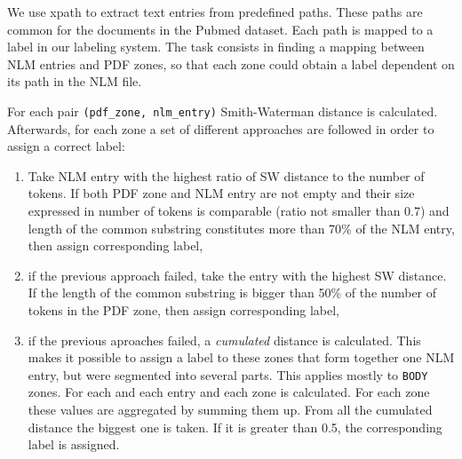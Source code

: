 We use xpath to extract text entries from predefined paths. These paths are common for the documents in the Pubmed dataset. Each path is mapped to a label in our labeling system. The task consists in finding a mapping between NLM entries and PDF zones, so that each zone could obtain a label dependent on its path in the NLM file.

For each pair \verb+(pdf_zone, nlm_entry)+ Smith-Waterman distance
is calculated. Afterwards, for each zone a set of different approaches are followed in order to assign a correct label:
\begin{enumerate}
\item Take NLM entry with the highest ratio of SW distance to the number of tokens. If both PDF zone and NLM entry are not empty and their size expressed in number of tokens is comparable (ratio not smaller than 0.7) and length of the common substring constitutes more than 70\% of the NLM entry, then assign corresponding label,
\item if the previous approach failed, take the entry with the highest SW distance. If the length of the common substring is bigger than 50\% of the number of tokens in the PDF zone, then assign corresponding label,
\item if the previous aproaches failed, a \textit{cumulated} distance is calculated. This makes it possible to assign a label to these zones that form together one NLM entry, but were segmented into several parts. This applies mostly to \verb+BODY+ zones. For each and each entry and each zone is calculated. For each zone these values are aggregated by summing them up. From all the cumulated distance the biggest one is taken. If it is greater than 0.5, the corresponding label is assigned.
\end{enumerate}
